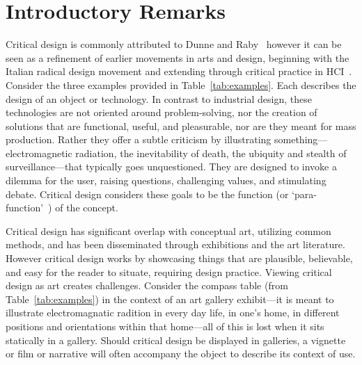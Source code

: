 

\section{Introductory Remarks}







Critical design is commonly attributed to Dunne and Raby~\cite{DuRa01,Dun05} however it can be seen as a refinement of earlier movements in arts and design, beginning with the Italian radical design movement and extending through critical practice in HCI~\cite{Mal17}. Consider the three examples provided in Table~\ref{tab:examples}. Each describes the design of an object or technology. In contrast to industrial design, these technologies are not oriented around problem-solving, nor the creation of solutions that are functional, useful, and pleasurable, nor are they meant for mass production. Rather they offer a subtle criticism by illustrating something---electromagnetic radiation, the inevitability of death, the ubiquity and stealth of surveillance---that typically goes unquestioned. They are designed to invoke a dilemma for the user, raising questions, challenging values, and stimulating debate. Critical design considers these goals to be the function (or `para-function'~\cite{Dun05}) of the concept. %

Critical design has significant overlap with conceptual art, utilizing common methods, and has been disseminated through exhibitions and the art literature. However critical design works by showcasing things that are plausible, believable, and easy for the reader to situate, requiring design practice. Viewing critical design as art creates challenges. Consider the compass table (from Table~\ref{tab:examples}) in the context of an art gallery exhibit---it is meant to illustrate electromagnatic radition in every day life, in one's home, in different positions and orientations within that home---all of this is lost when it sits statically in a gallery. Should critical design be displayed in galleries, a vignette or film or narrative will often accompany the object to describe its context of use.

